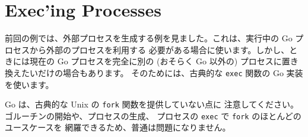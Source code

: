 \section{Exec'ing Processes}

前回の例では、外部プロセスを生成する例を見ました。これは、実行中の Go プロセスから外部のプロセスを利用する 必要がある場合に使います。しかし、ときには現在の Go プロセスを完全に別の (おそらく Go 以外の) プロセスに置き換えたいだけの場合もあります。 そのためには、古典的な \texttt{exec} 関数の Go 実装を使います。




Go は、古典的な Unix の \texttt{fork} 関数を提供していない点に 注意してください。ゴルーチンの開始や、プロセスの生成、 プロセスの \texttt{exec} で \texttt{fork} のほとんどのユースケースを 網羅できるため、普通は問題になりません。